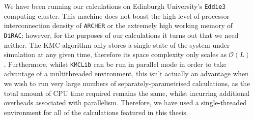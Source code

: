 We have been running our calculations on Edinburgh University's \texttt{Eddie3} computing cluster.
This machine does not boast the high level of processor interconnection density of \texttt{ARCHER}
or the extremely high working memory of \texttt{DiRAC}; however, for the purposes of our calculations
it turns out that we need neither. The KMC algorithm only stores a single state of the system under
simulation at any given time, therefore its space complexity only scales as $\mathcal{O}(L)$.
Furthermore, whilst \texttt{KMCLib} can be run in parallel mode in order to take advantage of
a multithreaded environment, this isn't actually an advantage when we wish to run very large numbers
of separately-parametrised calculations, as the total amount of CPU time required remains the same,
whilst incurring additional overheads associated with parallelism.
Therefore, we have used a single-threaded environment for all of the calculations featured in this
thesis.

